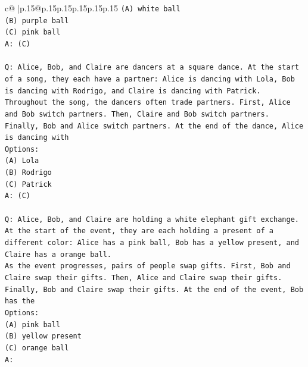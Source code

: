 \documentclass{article}
\begin{document}
{\begin{supertabular}{c@{$\;$}|p{.15\linewidth}@{}p{.15\linewidth}p{.15\linewidth}p{.15\linewidth}p{.15\linewidth}p{.15\linewidth}}
{{{\texttt{(A) white ball} \\
\texttt{(B) purple ball} \\
\texttt{(C) pink ball} \\
\texttt{A: (C)} \\
\\ 
\texttt{Q: Alice, Bob, and Claire are dancers at a square dance. At the start of a song, they each have a partner: Alice is dancing with Lola, Bob is dancing with Rodrigo, and Claire is dancing with Patrick.} \\
\texttt{Throughout the song, the dancers often trade partners. First, Alice and Bob switch partners. Then, Claire and Bob switch partners. Finally, Bob and Alice switch partners. At the end of the dance, Alice is dancing with} \\
\texttt{Options:} \\
\texttt{(A) Lola} \\
\texttt{(B) Rodrigo} \\
\texttt{(C) Patrick} \\
\texttt{A: (C)} \\
\\ 
\texttt{Q: Alice, Bob, and Claire are holding a white elephant gift exchange. At the start of the event, they are each holding a present of a different color: Alice has a pink ball, Bob has a yellow present, and Claire has a orange ball.} \\
\texttt{As the event progresses, pairs of people swap gifts. First, Bob and Claire swap their gifts. Then, Alice and Claire swap their gifts. Finally, Bob and Claire swap their gifts. At the end of the event, Bob has the} \\
\texttt{Options:} \\
\texttt{(A) pink ball} \\
\texttt{(B) yellow present} \\
\texttt{(C) orange ball} \\
\texttt{A:} \\
            }
        }
    }
     \\ \\


\end{supertabular}}
\end{document}
